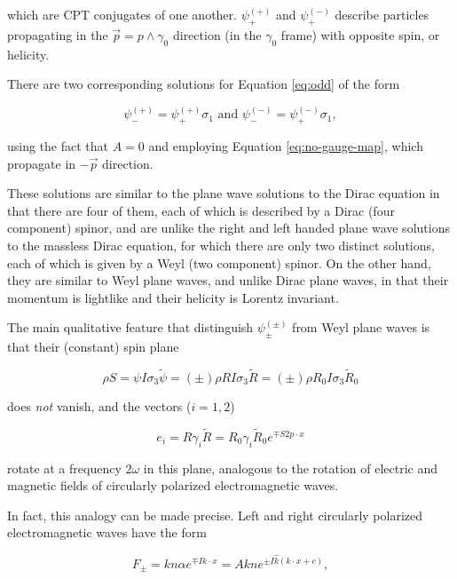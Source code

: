 \documentclass{article}
\begin{document}
  which are CPT conjugates of one another. $\psi^{(+)}_+$ and $\psi^{(-)}_+$ describe particles propagating in the $\vec p = p \wedge \gamma_0$ direction (in the $\gamma_0$ frame) with opposite spin, or helicity.

  There are two corresponding solutions for Equation \ref{eq:odd} of the form

  \begin{equation}
    \psi^{(+)}_- = \psi^{(+)}_+ \sigma_1 \text{ and }
    \psi^{(-)}_- = \psi^{(-)}_+ \sigma_1,
  \end{equation}

  using the fact that $A=0$ and employing Equation \ref{eq:no-gauge-map}, which propagate in $-\vec p$ direction.

  These solutions are similar to the plane wave solutions to the Dirac equation in that there are four of them, each of which is described by a Dirac (four component) spinor, and are unlike the right and left handed plane wave solutions to the massless Dirac equation, for which there are only two distinct solutions, each of which is given by a Weyl (two component) spinor. On the other hand, they are similar to Weyl plane waves, and unlike Dirac plane waves, in that their momentum is lightlike and their helicity is Lorentz invariant.

  The main qualitative feature that distinguish $\psi^{(\pm)}_{\pm}$ from Weyl plane waves is that their (constant) spin plane 

  \begin{equation}
    \rho S = \psi I \sigma_3 \widetilde \psi = (\pm) \rho  R I \sigma_3 \widetilde R = (\pm) \rho R_0 I \sigma_3 \widetilde R_0
  \end{equation}

  does \emph{not} vanish, and the vectors ($i = 1, 2$)

  \begin{equation}
    e_i = R \gamma_i \widetilde R = R_0 \gamma_i \widetilde R_0 e^{\mp S 2 p \cdot x}
  \end{equation} 

  rotate at a frequency $2 \omega$ in this plane, analogous to the rotation of electric and magnetic fields of circularly polarized electromagnetic waves.

  In fact, this analogy can be made precise. Left and right circularly polarized electromagnetic waves have the form\cite{gap}

    \begin{equation}
      F_\pm = k n \alpha e^{\mp I k \cdot x} = A k n e^{\pm I \hat k (k \cdot x + c)},\label{eq:emwaves}
    \end{equation}
\end{document}

